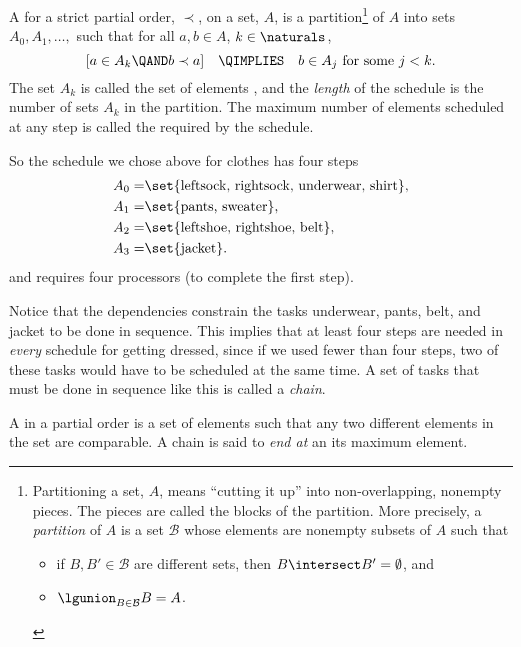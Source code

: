 \begin{definition}\label{def:schedule}
A  for a strict partial order, $\prec$, on a set,
$A$, is a partition\footnote{Partitioning a set,
$A$, means ``cutting it up'' into non-overlapping, nonempty pieces.  The
pieces are called the blocks of the partition.  More precisely, a
\emph{partition} of $A$ is a set $\mathcal{B}$ whose elements are nonempty
subsets of $A$ such that
\begin{itemize}
\item if $B,B' \in \mathcal{B}$ are different sets, then $B \intersect B' =
 \emptyset$, and
\item $\lgunion_{B\in \mathcal{B}} B = A$.
\end{itemize}} of $A$ into sets $A_0, A_1,\dots,$ such
that for all $a,b \in A$, $k \in \naturals$,
\[
[a \in A_k \QAND b \prec a] \quad\QIMPLIES\quad b \in A_j \text{ for some } j < k.
\]
The set $A_k$ is called the set of
elements , and the \emph{length} of the
schedule is the number of sets $A_k$ in the partition.  The maximum
number of elements scheduled at any step is called the  required by the schedule.
\end{definition}

So the schedule we chose above for clothes has four steps
\begin{align*}
A_0 = & \set{\text{leftsock, rightsock, underwear, shirt}},\\
A_1 = & \set{\text{pants, sweater}},\\
A_2 = & \set{\text{leftshoe, rightshoe, belt}},\\
A_3 = & \set{\text{jacket}}.
\end{align*}
and requires four processors (to complete the first step).

Notice that the dependencies constrain the tasks underwear, pants,
belt, and jacket to be done in sequence.  This implies
that at least four steps are needed in \emph{every} schedule for
getting dressed, since if we used fewer than four steps, two of these
tasks would have to be scheduled at the same time.  A set of tasks
that must be done in sequence like this is called a \emph{chain}.

\begin{definition}
A  in a partial order is a set of elements such that any
two different elements in the set are comparable.  A chain is said to
\emph{end at} an its maximum element.
\end{definition}

